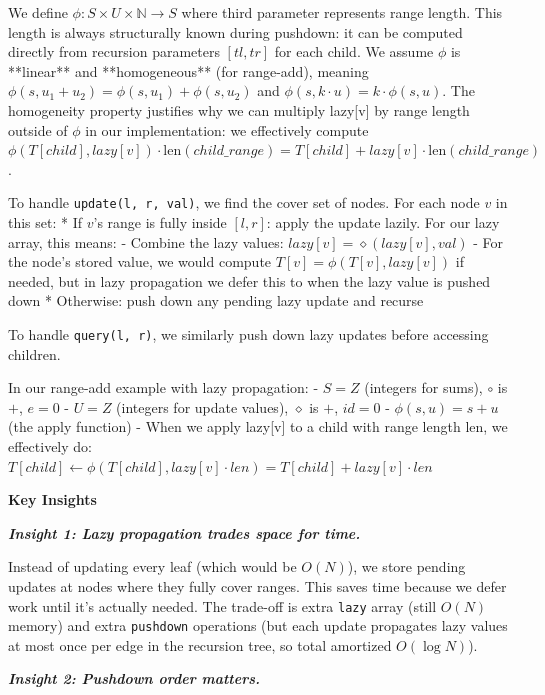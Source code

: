 We define $\phi : S \times U \times \mathbb{N} \rightarrow S$ where third parameter represents range length. This length is always structurally known during pushdown: it can be computed directly from recursion parameters $[tl, tr]$ for each child. We assume $\phi$ is **linear** and **homogeneous** (for range-add), meaning $\phi(s, u_1 + u_2) = \phi(s, u_1) + \phi(s, u_2)$ and $\phi(s, k \cdot u) = k \cdot \phi(s, u)$. The homogeneity property justifies why we can multiply lazy[v] by range length outside of $\phi$ in our implementation: we effectively compute $\phi(T[child], lazy[v]) \cdot \text{len}(child\_range) = T[child] + lazy[v] \cdot \text{len}(child\_range)$.


To handle {\tt update(l, r, val)}, we find the cover set of nodes. For each node $v$ in this set:
\begitems
* If $v$'s range is fully inside $[l, r]$: apply the update lazily. For our lazy array, this means:
- Combine the lazy values: $lazy[v] = \diamond(lazy[v], val)$
- For the node's stored value, we would compute $T[v] = \phi(T[v], lazy[v])$ if needed, but in lazy propagation we defer this to when the lazy value is pushed down
* Otherwise: push down any pending lazy update and recurse
\enditems

To handle {\tt query(l, r)}, we similarly push down lazy updates before accessing children.

In our range-add example with lazy propagation:
- $S = Z$ (integers for sums), $\circ$ is $+$, $e = 0$
- $U = Z$ (integers for update values), $\diamond$ is $+$, $id = 0$
- $\phi(s, u) = s + u$ (the apply function)
- When we apply lazy[v] to a child with range length len, we effectively do: $T[child] \gets \phi(T[child], lazy[v] \cdot len) = T[child] + lazy[v] \cdot len$

{\bf Key Insights}

\bf \it Insight 1: Lazy propagation trades space for time.\rm

Instead of updating every leaf (which would be $O(N)$), we store pending updates at nodes where they fully cover ranges. This saves time because we defer work until it's actually needed. The trade-off is extra {\tt lazy} array (still $O(N)$ memory) and extra {\tt pushdown} operations (but each update propagates lazy values at most once per edge in the recursion tree, so total amortized $O(\log N)$).

\bf \it Insight 2: Pushdown order matters.\rm

